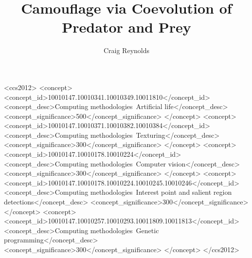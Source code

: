 \documentclass[sigconf]{acmart}
\begin{document}
\title{Camouflage via Coevolution of Predator and Prey}

\author{Craig Reynolds}

\renewcommand{\shortauthors}{Craig Reynolds}


\begin{CCSXML}
<ccs2012>
   <concept>
       <concept_id>10010147.10010341.10010349.10011810</concept_id>
       <concept_desc>Computing methodologies~Artificial life</concept_desc>
       <concept_significance>500</concept_significance>
       </concept>
   <concept>
       <concept_id>10010147.10010371.10010382.10010384</concept_id>
       <concept_desc>Computing methodologies~Texturing</concept_desc>
       <concept_significance>300</concept_significance>
       </concept>
   <concept>
       <concept_id>10010147.10010178.10010224</concept_id>
       <concept_desc>Computing methodologies~Computer vision</concept_desc>
       <concept_significance>300</concept_significance>
       </concept>
    <concept>
       <concept_id>10010147.10010178.10010224.10010245.10010246</concept_id>
       <concept_desc>Computing methodologies~Interest point and salient region detections</concept_desc>
       <concept_significance>300</concept_significance>
       </concept>
    <concept>
        <concept_id>10010147.10010257.10010293.10011809.10011813</concept_id>
        <concept_desc>Computing methodologies~Genetic programming</concept_desc>
        <concept_significance>300</concept_significance>
        </concept>
 </ccs2012>
\end{CCSXML}



\end{document}
